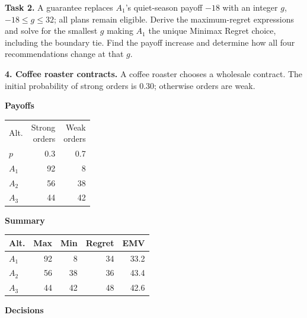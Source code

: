 \begin{studentproblem}
\textbf{Task 2.} A guarantee replaces $A_1$'s quiet-season payoff $-18$ with an integer $g$, $-18\leq g\leq32$; all plans remain eligible. Derive the maximum-regret expressions and solve for the smallest $g$ making $A_1$ the unique Minimax Regret choice, including the boundary tie. Find the payoff increase and determine how all four recommendations change at that $g$.
\tasktwobox
\end{studentproblem}

\begin{studentproblem}
\textbf{4. Coffee roaster contracts.} A coffee roaster chooses a wholesale contract. The initial probability of strong orders is 0.30; otherwise orders are weak.
\begin{center}
	\begingroup
	\normalsize
	\setlength{\tabcolsep}{2.5pt}
	\renewcommand{\arraystretch}{1.1}
	
	\begin{minipage}[t]{0.31\linewidth}
		\centering
		\textbf{Payoffs}\par\vspace{2pt}
		\begin{tabular}{@{}lrr@{}}\toprule Alt. & \shortstack{Strong\\orders} & \shortstack{Weak\\orders}\\
$p$ & 0.3 & 0.7\\
\midrule
$A_1$ & 92 & 8\\
$A_2$ & 56 & 38\\
$A_3$ & 44 & 42\\
\bottomrule\end{tabular}
	\end{minipage}%
	\hfill
	\begin{minipage}[t]{0.33\linewidth}
		\centering
		\textbf{Summary}\par\vspace{2pt}
		\begin{tabular}{@{}lrrrr@{}}\toprule Alt. & Max & Min & Regret & EMV\\\midrule
$A_1$ & 92 & 8 & 34 & 33.2\\
$A_2$ & 56 & 38 & 36 & 43.4\\
$A_3$ & 44 & 42 & 48 & 42.6\\
\bottomrule\end{tabular}
	\end{minipage}%
	\hfill
	\begin{minipage}[t]{0.32\linewidth}
		\centering
		\textbf{Decisions}\par\vspace{2pt}
		\choices
	\end{minipage}
	

\end{center}
\end{studentproblem}
